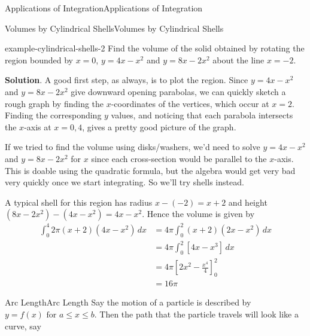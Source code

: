 \documentclass[10pt,]{book}
\numberwithin{equation}{section}
\newcommand{\amp}{&}
\begin{document}
\begin{chapterptx}{Applications of Integration}{}{Applications of Integration}{}{}
\begin{sectionptx}{Volumes by Cylindrical Shells}{}{Volumes by Cylindrical Shells}{}{}
\begin{example}{}{example-cylindrical-shells-2}%
\hypertarget{p-645}{}%
Find the volume of the solid obtained by rotating the region bounded by \(x = 0\), \(y = 4x - x^{2}\) and \(y = 8x - 2x^{2}\) about the line \(x = -2\).%
\par\smallskip%
\noindent\textbf{Solution}.\hypertarget{solution-141}{}\quad%
\hypertarget{p-646}{}%
A good first step, as always, is to plot the region. Since \(y = 4x - x^{2}\) and \(y = 8x - 2x^{2}\) give downward opening parabolas, we can quickly sketch a rough graph by finding the \(x\)-coordinates of the vertices, which occur at \(x = 2\). Finding the corresponding \(y\) values, and noticing that each parabola intersects the \(x\)-axis at \(x = 0, 4\), gives a pretty good picture of the graph.%
\par
\hypertarget{p-647}{}%
If we tried to find the volume using disks/washers, we'd need to solve \(y = 4x - x^{2}\) and \(y = 8x - 2x^{2}\) for \(x\) since each cross-section would be parallel to the \(x\)-axis. This is doable using the quadratic formula, but the algebra would get very bad very quickly once we start integrating. So we'll try shells instead.%
\par
\hypertarget{p-648}{}%
A typical shell for this region has radius \(x - (-2) = x + 2\) and height \((8x - 2x^{2}) - (4x - x^{2}) = 4x - x^{2}\). Hence the volume is given by%
\begin{align*}
\int_{0}^{4}2\pi(x + 2)(4x - x^{2})\,dx \amp= 4\pi\int_{0}^{2}(x + 2)(2x - x^{2})\,dx\\
\amp= 4\pi\int_{0}^{2}\left[4x - x^{3}\right]\,dx\\
\amp= 4\pi\left[2x^{2} - \frac{x^{4}}{4}\right]_{0}^{2}\\
\amp= 16\pi
\end{align*}
%
\end{example}
\end{sectionptx}
%
%
\typeout{************************************************}
\typeout{************************************************}
%
\begin{sectionptx}{Arc Length}{}{Arc Length}{}{}\label{section-arc-length}
\hypertarget{p-649}{}%
Say the motion of a particle is described by \(y = f(x) \text{ for } a \leq x \leq b.\) Then the path that the particle travels will look like a curve, say \begin{figure}
\centering
{
}
\end{figure}
\end{sectionptx}
\end{chapterptx}
\end{document}

